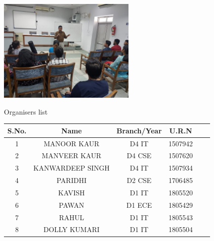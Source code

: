 \documentclass[12pt, a4 paper]{article}
\begin{document}
\begin{center}
\medskip\medskip

\includegraphics[height=5cm]{image3.jpg}

\end{center}

\begin{center}
\huge Organisers list
\end{center}

\begin{table}[h!]
  \begin{center}
    \begin{tabular}{|c|c|c|c|c|c|} 
    \toprule %
      \textbf{S.No.} & \textbf{Name} & \textbf{Branch/Year} & \textbf{U.R.N} \\
      \midrule %
      1 & MANOOR KAUR	   & D4 IT	& 1507942 \\
      2	& MANVEER KAUR	   & D4 CSE	& 1507620 \\
      3	& KANWARDEEP SINGH & D4 IT	& 1507934 \\
      4	& PARIDHI	       & D2 CSE	& 1706485 \\
      5	& KAVISH	       & D1 IT	& 1805520 \\
      6	& PAWAN	           & D1 ECE	& 1805429 \\
      7	& RAHUL	           & D1 IT	& 1805543 \\
      8	& DOLLY KUMARI	   & D1 IT  & 1805504 \\

      \bottomrule %
    \end{tabular}
  \end{center}
\end{table}
\end{document}

